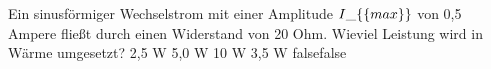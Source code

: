     {Ein sinusförmiger Wechselstrom mit einer Amplitude $I\_\{\textrm\{max\}\}$ von 0,5 Ampere fließt durch einen Widerstand von 20 Ohm. Wieviel Leistung wird in Wärme umgesetzt?}
    {2,5 W}
    {5,0 W}
    {10 W}
    {3,5 W}
    {false}{false}